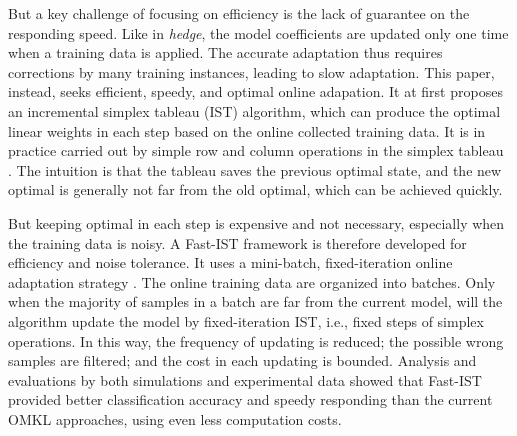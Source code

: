 \documentclass[letterpaper]{article}
\begin{document}
But a key challenge of focusing on efficiency is the lack of guarantee on the responding speed.  Like in \emph{hedge}\cite{chaudhuri2009parameter}\cite{Freund1997119}, the model coefficients are updated only one time when a training data is applied. The accurate adaptation thus requires corrections by many training instances, leading to slow adaptation.  This paper, instead,  seeks efficient, speedy, and optimal online adapation.  It at first proposes an incremental simplex tableau (IST) algorithm, which can produce the optimal linear weights in each step based on the online collected training data. It is in practice carried out by simple row and column operations in the simplex tableau \cite{Schrijver:1986:TLI:17634}. The intuition is that the tableau saves the previous optimal state, and the new optimal is generally not far from the old optimal, which can be achieved quickly.

But keeping optimal in each step is expensive and not necessary, especially when the training data is noisy. A Fast-IST framework is therefore developed for efficiency and noise tolerance. It uses a mini-batch, fixed-iteration online adaptation strategy \cite{bottou1998online}. The online training data are organized into batches. Only when the majority of samples in a batch are far from the current model, will the algorithm update the model by fixed-iteration IST, i.e., fixed steps of simplex operations. In this way, the frequency of updating is reduced; the possible wrong samples are filtered; and the cost in each updating is bounded.  Analysis and evaluations by both simulations and experimental data showed that Fast-IST provided better classification accuracy and speedy responding than the current OMKL approaches\cite{Freund1997119}\cite{chaudhuri2009parameter}, using even less computation costs. %






\end{document}
